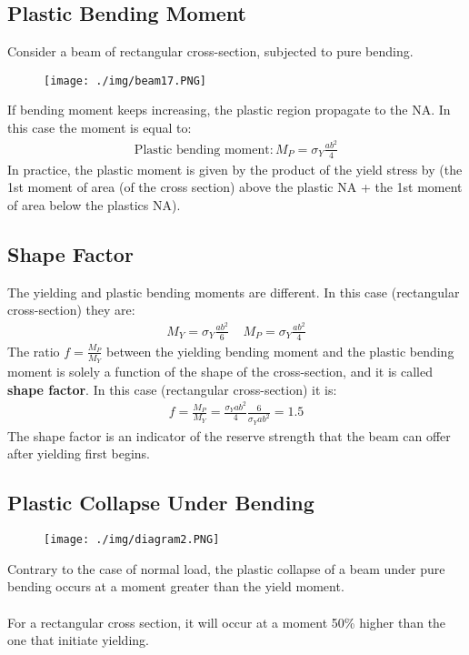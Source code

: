 \subsection{Plastic Bending Moment}
Consider a beam of rectangular cross-section, subjected to pure bending.
\begin{figure}[H]
  \centering
  \texttt{[image: ./img/beam17.PNG]}
\end{figure}
If bending moment keeps increasing, the plastic region propagate to the NA. In this case the moment is equal to:
\begin{gather}
  \text{Plastic bending moment}: M_P = \sigma_Y\frac{ab^2}{4}
\end{gather}
In practice, the plastic moment is given by the product of the yield stress by (the 1st moment of area (of the cross section) above the plastic NA + the 1st moment of area below the plastics NA).
\subsection{Shape Factor}
The yielding and plastic bending moments are different. In this case (rectangular cross-section) they are:
\begin{gather}
  M_Y = \sigma_Y\frac{ab^2}{6} \ \ \ \ \ M_P = \sigma_Y\frac{ab^2}{4}
\end{gather}
The ratio $f = \frac{M_P}{M_Y}$ between the yielding bending moment and the plastic bending moment is solely a function of the shape of the cross-section, and it is called \textbf{shape factor}. In this case (rectangular cross-section) it is:
\begin{gather}
  f = \frac{M_P}{M_Y} = \frac{\sigma_Y ab^2}{4}\frac{6}{\sigma_Y ab^2} = 1.5
\end{gather}
The shape factor is an indicator of the reserve strength that the beam can offer after yielding first begins.
\subsection{Plastic Collapse Under Bending}
\begin{figure}[H]
  \centering
  \texttt{[image: ./img/diagram2.PNG]}
\end{figure}
Contrary to the case of normal load, the plastic collapse of a beam under pure bending occurs at a moment greater than the yield moment. \\\\
For a rectangular cross section, it will occur at a moment 50\% higher than the one that initiate yielding.
